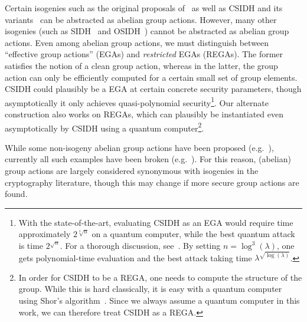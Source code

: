 \documentclass{article}\usepackage[a4paper,margin=20mm]{geometry}
\numberwithin{theorem}{section}
\numberwithin{equation}{section}
\begin{document}
Certain isogenies such as the original proposals of~\cite{EPRINT:Couveignes06,EPRINT:RosSto06} as well as CSIDH and its variants~\cite{AC:CLMPR18,PKC:DFKLMP23} can be abstracted as abelian group actions. However, many other isogenies (such as SIDH~\cite{DJP14}  and OSIDH~\cite{CD20}) cannot be abstracted as abelian group actions. Even among abelian group actions, we must distinguish between ``effective group actions'' (EGAs) and \emph{restricted} EGAs (REGAs). The former satisfies the notion of a clean group action, whereas in the latter, the group action can only be efficiently computed for a certain small set of group elements. CSIDH could plausibly be a EGA at certain concrete security parameters, though asymptotically it only achieves quasi-polynomial security\footnote{With the state-of-the-art, evaluating CSIDH as an EGA would require time approximately $2^{\sqrt[3]{n}}$ on a quantum computer, while the best quantum attack is time $2^{\sqrt{n}}$. For a thorough discussion, see~\cite{Panny23}. By setting $n=\log^3(\lambda)$, one gets polynomial-time evaluation and the best attack taking time $\lambda^{\sqrt{\log(\lambda)}}$.}. Our alternate construction also works on REGAs, which can plausibly be instantiated even asymptotically by CSIDH using a quantum computer\footnote{In order for CSIDH to be a REGA, one needs to compute the structure of the group. While this is hard classically, it is easy with a quantum computer using Shor's algorithm~\cite{FOCS:Shor94}. Since we always assume a quantum computer in this work, we can therefore treat CSIDH as a REGA.}.

While some non-isogeny abelian group actions have been proposed (e.g.~\cite{Stickel05}), currently all such examples have been broken (e.g.~\cite{Shpilrain08}). For this reason, (abelian) group actions are largely considered synonymous with isogenies in the cryptography literature, though this may change if more secure group actions are found.
\end{document}
